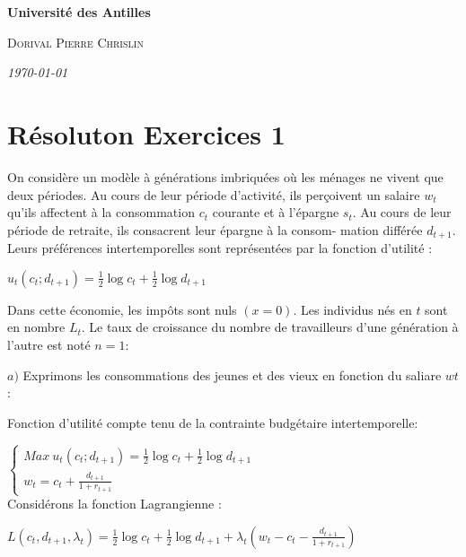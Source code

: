 \documentclass[11pt,twoside,a4paper]{article}
\begin{document}
\tableofcontents %

\begin{titlepage}
    \centering
    {\LARGE\bfseries Université des Antilles\par}
    \vspace{2cm}
    {\scshape\Large Dorival Pierre Chrislin\par}
    \vspace{2cm}
    {\large\itshape\today\par}
\end{titlepage}

\section*{Résoluton Exercices 1}

On considère un modèle à générations imbriquées où les ménages ne vivent
que deux périodes. Au cours de leur période d'activité, ils perçoivent un
salaire $w_t$ qu'ils affectent à la consommation $c_t$ courante et à l'épargne $s_t$.
Au cours de leur période de retraite, ils consacrent leur épargne à la consom-
mation différée $d_{t+1}$. Leurs préférences intertemporelles sont représentées par
la fonction d'utilité :


$u_t(c_t; d_{t+1})=\frac{1}{2}\log{c_t} + \frac{1}{2}\log{d_{t+1}}$


Dans cette économie, les impôts sont nuls $(x = 0)$. Les individus nés en $t$
sont en nombre $L_t$. Le taux de croissance du nombre de travailleurs d'une
génération à l'autre est noté $n = 1$:

$a)$ Exprimons les consommations des jeunes et des vieux en fonction du saliare
$wt$:

Fonction d'utilité compte tenu de la contrainte budgétaire intertemporelle:

$ \left\{\begin{array}{rl}
 Max \ u_t(c_t; d_{t+1})=  \frac{1}{2}\log{c_t} + \frac{1}{2}\log{d_{t+1}} \\
 
w_t  =  c_t + \frac{d_{t+1}}{1+r_{t+1}}\end{array}\right. $  \\

Considérons la fonction Lagrangienne :

$ L(c_t,d_{t+1},\lambda_t)= \frac{1}{2}\log{c_t} + \frac{1}{2}\log{d_{t+1}} +\lambda_t(w_t-c_t - \frac{d_{t+1}}{1+r_{t+1}})  $  \\
\end{document}
